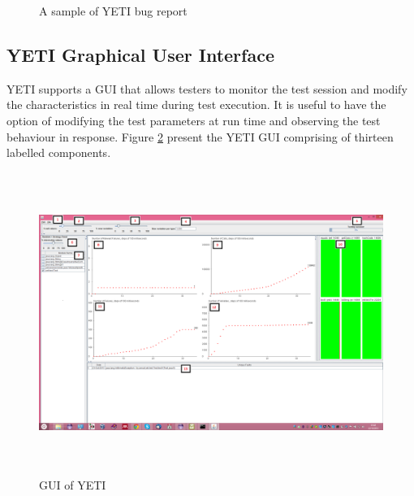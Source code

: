\begin{figure}[h]
	\centering
	\caption{A sample of YETI bug report}
	\label{bugReport}
\end{figure}

\subsection{YETI Graphical User Interface}
YETI supports a GUI that allows testers to monitor the test session and modify the characteristics in real time during test execution. It is useful to have the option of modifying the test parameters at run time and observing the test behaviour in response. Figure \ref{fig:yetiGUI1} present the YETI GUI comprising of thirteen labelled components.

\begin{figure}[h]
	\centering
	\includegraphics[width= 15cm, height = 9.8cm]{chapter3/yetiGUI.png}
	\caption{GUI of YETI}
	\label{fig:yetiGUI1}
\end{figure}

